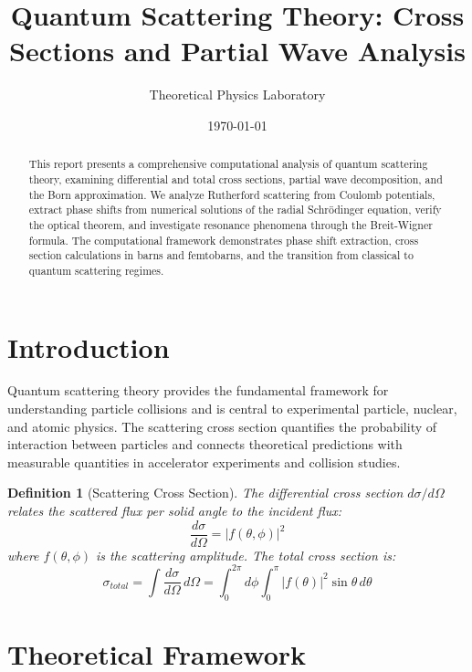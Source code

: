 \documentclass[a4paper, 11pt]{article}
\title{Quantum Scattering Theory: Cross Sections and Partial Wave Analysis}
\author{Theoretical Physics Laboratory}
\date{\today}
\newtheorem{definition}{Definition}[section]
\begin{document}
\maketitle

\begin{abstract}
This report presents a comprehensive computational analysis of quantum scattering theory,
examining differential and total cross sections, partial wave decomposition, and the Born
approximation. We analyze Rutherford scattering from Coulomb potentials, extract phase shifts
from numerical solutions of the radial Schrödinger equation, verify the optical theorem, and
investigate resonance phenomena through the Breit-Wigner formula. The computational framework
demonstrates phase shift extraction, cross section calculations in barns and femtobarns, and
the transition from classical to quantum scattering regimes.
\end{abstract}

\section{Introduction}

Quantum scattering theory provides the fundamental framework for understanding particle collisions
and is central to experimental particle, nuclear, and atomic physics. The scattering cross section
quantifies the probability of interaction between particles and connects theoretical predictions
with measurable quantities in accelerator experiments and collision studies.

\begin{definition}[Scattering Cross Section]
The differential cross section $d\sigma/d\Omega$ relates the scattered flux per solid angle to
the incident flux:
\begin{equation}
\frac{d\sigma}{d\Omega} = |f(\theta, \phi)|^2
\end{equation}
where $f(\theta, \phi)$ is the scattering amplitude. The total cross section is:
\begin{equation}
\sigma_{total} = \int \frac{d\sigma}{d\Omega} \, d\Omega = \int_0^{2\pi} d\phi \int_0^\pi |f(\theta)|^2 \sin\theta \, d\theta
\end{equation}
\end{definition}

\section{Theoretical Framework}
\end{document}
